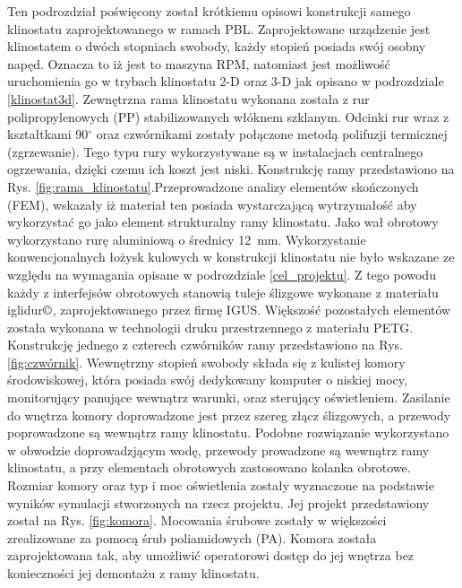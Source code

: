 Ten podrozdział poświęcony został krótkiemu opisowi konstrukcji samego klinostatu
zaprojektowanego w ramach PBL. Zaprojektowane urządzenie jest klinostatem o dwóch stopniach
swobody, każdy stopień posiada swój osobny napęd. Oznacza to iż jest to maszyna RPM, natomiast
jest możliwość uruchomienia go w trybach klinostatu 2-D oraz 3-D jak opisano w podrozdziale
\ref{klinostat3d}. Zewnętrzna rama klinostatu wykonana została z rur polipropylenowych (PP)
stabilizowanych włóknem szklanym. Odcinki rur wraz z kształtkami 90$^\circ$ oraz
czwórnikami zostały połączone metodą polifuzji termicznej (zgrzewanie). Tego typu rury
wykorzystywane są w instalacjach centralnego ogrzewania, dzięki czemu ich koszt jest
niski. Konstrukcję ramy przedstawiono na Rys. \ref{fig:rama_klinostatu}.Przeprowadzone
analizy elementów skończonych (FEM), wskazały iż materiał ten posiada wystarczającą
wytrzymałość aby wykorzystać go jako element strukturalny ramy klinostatu. Jako wał
obrotowy wykorzystano rurę aluminiową o średnicy \SI{12}{mm}. Wykorzystanie
konwencjonalnych łożysk kulowych w konstrukcji klinostatu nie było wskazane ze
względu na wymagania opisane w podrozdziale \ref{cel_projektu}. Z tego powodu każdy
z interfejsów obrotowych stanowią tuleje ślizgowe wykonane z materiału
iglidur$\copyright$, zaprojektowanego przez firmę IGUS. Większość pozostałych
elementów została wykonana w technologii druku przestrzennego z materiału PETG.
Konstrukcję jednego z czterech czwórników ramy przedstawiono na Rys.
\ref{fig:czwórnik}. Wewnętrzny stopień swobody składa się z kulistej komory
środowiskowej, która posiada swój dedykowany komputer o niskiej mocy,
monitorujący panujące wewnątrz warunki, oraz sterujący oświetleniem.
Zasilanie do wnętrza komory doprowadzone jest przez szereg złącz
ślizgowych, a przewody poprowadzone są wewnątrz ramy klinostatu. Podobne
rozwiązanie wykorzystano w obwodzie doprowadzjącym wodę, przewody
prowadzone są wewnątrz ramy klinostatu, a przy elementach obrotowych
zastosowano kolanka obrotowe. Rozmiar komory oraz typ i moc oświetlenia
zostały wyznaczone na podstawie wyników symulacji stworzonych na rzecz
projektu. Jej projekt przedstawiony został na Rys. \ref{fig:komora}.
Mocowania śrubowe zostały w większości zrealizowane za pomocą śrub
poliamidowych (PA). Komora została zaprojektowana tak, aby umożliwić operatorowi dostęp do jej
wnętrza bez konieczności jej demontażu z ramy klinostatu.

